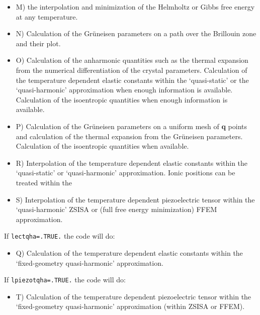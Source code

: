 \documentclass[12pt,a4paper,twoside]{report}
\begin{document}
\begin{itemize}

\item
M) the interpolation and minimization of the 
Helmholtz or Gibbs free energy at any temperature.

\item
N) Calculation of the Gr\"uneisen parameters on a path over the Brillouin
zone and their plot.

\item
O) Calculation of the anharmonic quantities such as the thermal expansion
from the numerical differentiation of the crystal parameters. 
Calculation of the temperature dependent elastic constants within 
the `quasi-static' or the `quasi-harmonic' approximation when enough 
information is available. Calculation of the isoentropic quantities when 
enough information is available. 

\item
P) Calculation of the Gr\"uneisen parameters on a uniform mesh of {\bf q} 
points and calculation of the thermal expansion from the Gr\"uneisen parameters.
Calculation of the isoentropic quantities when available.

\item
R) Interpolation of the temperature dependent elastic constants within the
`quasi-static' or `quasi-harmonic' approximation. Ionic positions can be
treated within the 

\item
S) Interpolation of the temperature dependent piezoelectric tensor within the
`quasi-harmonic' ZSISA or (full free energy minimization) FFEM approximation.

\end{itemize}

If \texttt{lectqha=.TRUE.} the code will do:
\begin{itemize}
\item
Q) Calculation of the temperature dependent elastic constants within the
`fixed-geometry quasi-harmonic' approximation.

\end{itemize}

If \texttt{lpiezotqha=.TRUE.} the code will do:
\begin{itemize}
\item
T) Calculation of the temperature dependent piezoelectric tensor within the
`fixed-geometry quasi-harmonic' approximation (within ZSISA or FFEM).
\end{itemize}
\end{document}
